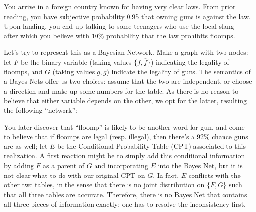 \documentclass{article}
\begin{document}
	\begin{example}\label{ex:guns-and-floomps}
		You arrive in a foreign country known for having very clear laws. From prior reading, you have subjective probability 0.95 that owning guns is against the law. Upon landing, you end up talking to some teenagers who use the local slang---after which you believe with 10\% probability that the law prohibits floomps.
		
		Let's try to represent this as a Bayesian Network. Make a graph with two nodes: let $F$ be the binary variable (taking values $\{f, \overline f\}$) indicating the legality of floomps, and $G$ (taking values $g, \overline g$) indicate the legality of guns. 
		The semantics of a Bayes Nets offer us two choices: assume that the two are independent, or choose a direction and make up some numbers for the table.
		As there is no reason to believe that either variable depends on the other, we opt for the latter, resulting the following ``network'':	
		
		\begin{center}
		\end{center}
		
		You later discover that ``floomp'' is likely to be another word for gun, and come to believe that if floomps are legal (resp. illegal), then there's a 92\% chance guns are as well; let $E$ be the Conditional Probability Table (CPT) associated to this realization.
		A first reaction might be to simply add this conditional information by adding $F$ as a parent of $G$ and incorporating $E$ into the Bayes Net, but it is not clear what to do with our original CPT on $G$.
		In fact, $E$ conflicts with the other two tables, in the sense that there is no joint distribution on $\{F, G\}$ such that all three tables are accurate. 
		Therefore, there is no Bayes Net that contains all three pieces of information exactly: one has to resolve the inconsistency first.
			

\end{example}
\end{document}
